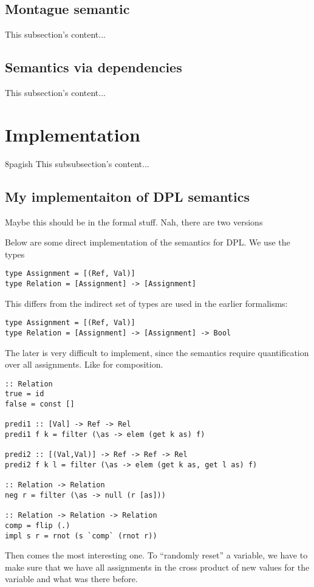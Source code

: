 \documentclass[12pt]{article}
\let\stdsection\section
\renewcommand\section{\newpage\stdsection}
\begin{document}
\subsection{Montague semantic}
This subsection's content...
\subsection{Semantics via dependencies}
This subsection's content...

\section{Implementation}
8pagish
This subsubsection's content...

\subsection{My implementaiton of DPL semantics}
Maybe this should be in the formal stuff. Nah, there are two versions

Below are some direct implementation of the semantics for DPL. We use the types
\begin{lstlisting}
type Assignment = [(Ref, Val)]
type Relation = [Assignment] -> [Assignment]
\end{lstlisting}
This differs from the indirect set of types are used in the earlier formalisms:
\begin{lstlisting}
type Assignment = [(Ref, Val)]
type Relation = [Assignment] -> [Assignment] -> Bool
\end{lstlisting}
The later is very difficult to implement, since the semantics require quantification over all assignments. Like for composition.

\begin{lstlisting}
:: Relation
true = id
false = const []

predi1 :: [Val] -> Ref -> Rel
predi1 f k = filter (\as -> elem (get k as) f)

predi2 :: [(Val,Val)] -> Ref -> Ref -> Rel
predi2 f k l = filter (\as -> elem (get k as, get l as) f)

:: Relation -> Relation
neg r = filter (\as -> null (r [as]))

:: Relation -> Relation -> Relation
comp = flip (.)
impl s r = rnot (s `comp` (rnot r))
\end{lstlisting}
Then comes the most interesting one. To ``randomly reset'' a variable, we have to make sure that we have all assignments in the cross product of new values for the variable and what was there before.
\end{document}

